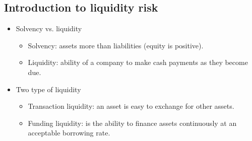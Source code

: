 \subsection{Introduction to liquidity risk}
\begin{itemize}
\item Solvency vs. liquidity
    \begin{itemize}
    \item Solvency: assets more than liabilities (equity is positive).
    \item Liquidity: ability of a company to make cash payments as they become due.
    \end{itemize}
\item Two type of liquidity
    \begin{itemize}
    \item Transaction liquidity: an asset is easy to exchange for other assets.
    \item Funding liquidity: is the ability to finance assets continuously at an acceptable borrowing rate.
    \end{itemize}
\end{itemize}



